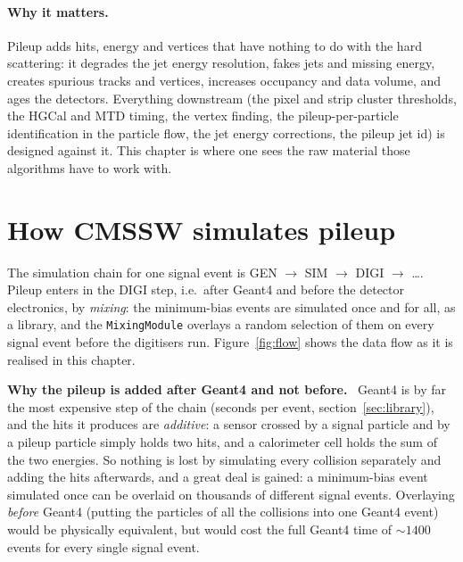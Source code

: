 \documentclass[11pt,a4paper]{article}
\newcommand{\code}[1]{\texttt{#1}}
\newenvironment{plainwords}[1][In plain words]{%
  \par\medskip\noindent\setlength{\fboxsep}{6pt}\setlength{\fboxrule}{0.6pt}%
  \begin{lrbox}{\plainbox}\begin{minipage}{\dimexpr\textwidth-2\fboxsep-2\fboxrule\relax}\small
  \textbf{\textcolor{plainrule}{#1.}}\ \ignorespaces}{%
  \end{minipage}\end{lrbox}\noindent\fcolorbox{plainrule}{plainbg}{\usebox{\plainbox}}\par\medskip}
\begin{document}
\paragraph{Why it matters.} Pileup adds hits, energy and vertices that have nothing to do with the hard
scattering: it degrades the jet energy resolution, fakes jets and missing energy, creates spurious tracks and
vertices, increases occupancy and data volume, and ages the detectors. Everything downstream (the pixel and
strip cluster thresholds, the HGCal and MTD timing, the vertex finding, the pileup-per-particle identification
in the particle flow, the jet energy corrections, the pileup jet id) is designed against it. This chapter is
where one sees the raw material those algorithms have to work with.

\section{How CMSSW simulates pileup}
\label{sec:how}

The simulation chain for one signal event is GEN $\to$ SIM $\to$ DIGI $\to$ \ldots{}. Pileup enters in the
DIGI step, i.e.\ after Geant4 and before the detector electronics, by \emph{mixing}: the minimum-bias events
are simulated once and for all, as a library, and the \code{MixingModule} overlays a random selection of
them on every signal event before the digitisers run. Figure~\ref{fig:flow} shows the data flow as it is
realised in this chapter.

\begin{plainwords}[Why the pileup is added after Geant4 and not before]
Geant4 is by far the most expensive step of the chain (seconds per event, section~\ref{sec:library}), and
the hits it produces are \emph{additive}: a sensor crossed by a signal particle and by a pileup particle
simply holds two hits, and a calorimeter cell holds the sum of the two energies. So nothing is lost by
simulating every collision separately and adding the hits afterwards, and a great deal is gained: a
minimum-bias event simulated once can be overlaid on thousands of different signal events. Overlaying
\emph{before} Geant4 (putting the particles of all the collisions into one Geant4 event) would be physically
equivalent, but would cost the full Geant4 time of $\sim1400$ events for every single signal event.
\end{plainwords}
\end{document}
